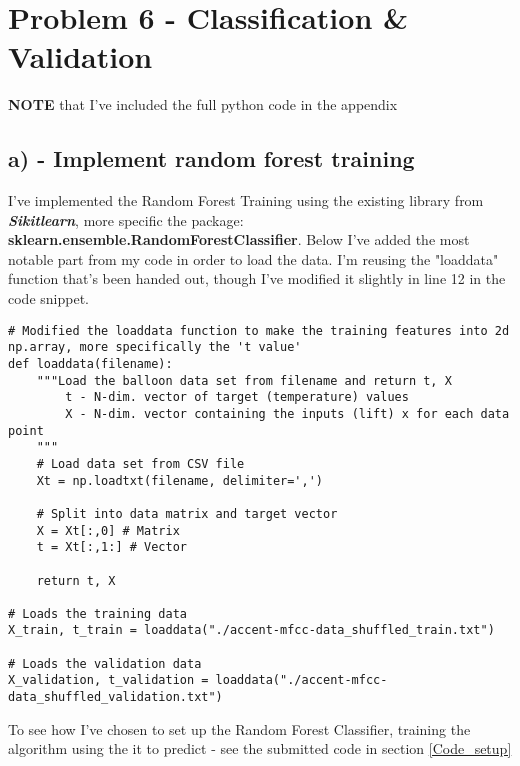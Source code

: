 \section{Problem 6 - Classification \& Validation}
\textbf{NOTE} that I've included the full python code in the appendix




\subsection{a) - Implement random forest training}

I've implemented the Random Forest Training using the existing library from \textbf{\textit{Sikitlearn}}, more specific
the package: \textbf{sklearn.ensemble.RandomForestClassifier}.
Below I've added the most notable part from my code in order to load the data. I'm reusing the "loaddata" function
that's been handed out, though I've modified it slightly in line 12 in the code snippet.
\begin{verbatim}
# Modified the loaddata function to make the training features into 2d np.array, more specifically the 't value'
def loaddata(filename):
    """Load the balloon data set from filename and return t, X
        t - N-dim. vector of target (temperature) values
        X - N-dim. vector containing the inputs (lift) x for each data point
    """
    # Load data set from CSV file
    Xt = np.loadtxt(filename, delimiter=',')
    
    # Split into data matrix and target vector
    X = Xt[:,0] # Matrix
    t = Xt[:,1:] # Vector
    
    return t, X

# Loads the training data
X_train, t_train = loaddata("./accent-mfcc-data_shuffled_train.txt")

# Loads the validation data
X_validation, t_validation = loaddata("./accent-mfcc-data_shuffled_validation.txt")

\end{verbatim}

To see how I've chosen to set up the Random Forest Classifier, training the algorithm using the
it to predict - see the submitted code in section \ref{Code_setup}


